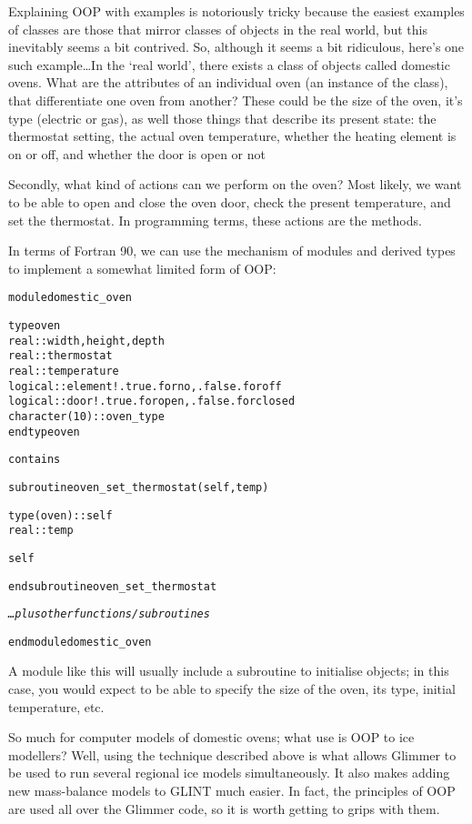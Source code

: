 Explaining OOP with examples is notoriously tricky because the easiest
examples of classes are those that mirror classes of objects in the real
world, but this inevitably seems a bit contrived. So, although it seems a bit
ridiculous, here's one such example\ldots In the `real world', there
exists a class of objects called domestic ovens. What are the
attributes of an individual oven (an instance of the class), that differentiate one oven
from another? These could be the size of the oven, it's type (electric or
gas), as well those things that describe its present state: the thermostat
setting, the actual oven temperature, whether the heating element is on or
off, and whether the door is open or not

Secondly, what kind of actions can we perform on the oven? Most likely, we
want to be able to open and close the oven door, check the present
temperature, and set the thermostat. In programming terms, these actions are the methods.

In terms of Fortran 90, we can use the mechanism of modules and derived types
to implement a somewhat limited form of OOP:
%
\begin{alltt}
  module domestic_oven

    type oven
      real :: width,height,depth
      real :: thermostat
      real :: temperature
      logical :: element      ! .true. for no, .false. for off
      logical :: door         ! .true. for open, .false. for closed
      character(10) :: oven_type
    end type oven

  contains

    subroutine oven_set_thermostat(self,temp)

      type(oven) :: self
      real :: temp

      self%temperature = temp

    end subroutine oven_set_thermostat

    \textrm{\textit{\ldots plus other functions/subroutines}}

  end module domestic_oven
\end{alltt}
%
A module like this will usually include a subroutine to initialise objects; in
this case, you would expect to be able to specify the size of the oven, its
type, initial temperature, etc.

So much for computer models of domestic ovens; what use is OOP to ice
modellers? Well, using the technique described above is what allows Glimmer to
be used to run several regional ice models simultaneously. It also makes
adding new mass-balance models to GLINT much easier. In fact, the principles
of OOP are used all over the Glimmer code, so it is worth getting to grips
with them.
%
